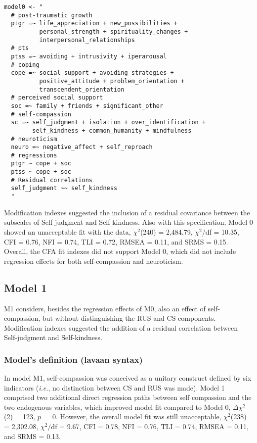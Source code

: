 \documentclass[aps,floatfix,prl]{revtex4}
\begin{document}
\begin{verbatim}
model0 <- "
  # post-traumatic growth
  ptgr =~ life_appreciation + new_possibilities + 
          personal_strength + spirituality_changes + 
          interpersonal_relationships
  # pts
  ptss =~ avoiding + intrusivity + iperarousal
  # coping
  cope =~ social_support + avoiding_strategies + 
          positive_attitude + problem_orientation + 
          transcendent_orientation
  # perceived social support
  soc =~ family + friends + significant_other
  # self-compassion
  sc =~ self_judgment + isolation + over_identification +
        self_kindness + common_humanity + mindfulness
  # neuroticism
  neuro =~ negative_affect + self_reproach
  # regressions
  ptgr ~ cope + soc  
  ptss ~ cope + soc 
  # Residual correlations
  self_judgment ~~ self_kindness
  "
\end{verbatim}

Modification indexes suggested the inclusion of a residual covariance
between the subscales of Self judgment and Self kindness. Also with this
specification, Model 0 showed an unacceptable fit with the data,
\(\chi^2\)(240) = 2,484.79, \(\chi^2\)/df = 10.35, CFI = 0.76, NFI =
0.74, TLI = 0.72, RMSEA = 0.11, and SRMS = 0.15. Overall, the CFA fit
indexes did not support Model 0, which did not include regression
effects for both self-compassion and neuroticism.

\newpage

\hypertarget{model-1}{%
\subsection{Model 1}\label{model-1}}

M1 considers, besides the regression effects of M0, also an effect of
self-compassion, but without distinguishing the RUS and CS components.
Modification indexes suggested the addition of a residual correlation
between Self-judgment and Self-kindness.

\hypertarget{models-definition-lavaan-syntax-1}{%
\subsubsection{Model's definition (lavaan
syntax)}\label{models-definition-lavaan-syntax-1}}

In model M1, self-compassion was conceived as a unitary construct
defined by six indicators (\emph{i.e.}, no distinction between CS and
RUS was made). Model 1 comprised two additional direct regression paths
between self compassion and the two endogenous variables, which improved
model fit compared to Model 0, \(\Delta \chi^2\)(2) = 123, \(p =\) 0.
However, the overall model fit was still unacceptable, \(\chi^2\)(238) =
2,302.08, \(\chi^2\)/df = 9.67, CFI = 0.78, NFI = 0.76, TLI = 0.74,
RMSEA = 0.11, and SRMS = 0.13.
\end{document}
